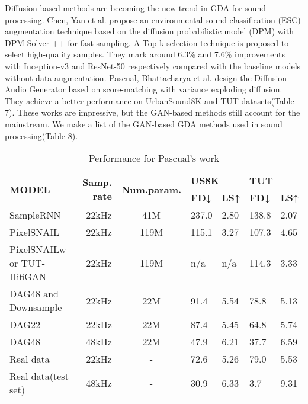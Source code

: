 \documentclass[preprint,12pt,authoryear]{elsarticle}
\begin{document}
Diffusion-based methods are becoming the new trend in GDA for sound processing. Chen, Yan et al. propose an environmental sound classification (ESC) augmentation technique based on the diffusion probabilistic model (DPM) with DPM-Solver ++ for fast sampling\cite{apl72}. A Top-k selection technique is proposed to select high-quality samples. They mark around 6.3\% and 7.6\% improvements with Inception-v3 and ResNet-50 respectively compared with the baseline models without data augmentation. Pascual, Bhattacharya et al. design the Diffusion Audio Generator based on score-matching with variance exploding diffusion\cite{apl73}. They achieve a better performance on UrbanSound8K and TUT datasets(Table 7). These works are impressive, but the GAN-based methods still account for the mainstream. We make a list of the GAN-based GDA methods used in sound processing(Table 8).
\begin{table}[t]
\begin{tabular}{p{2cm}rcllll}
\hline
\multirow{2}{*}{\textbf{MODEL}} &
  \multirow{2}{*}{\textbf{Samp. rate}} &
  \multirow{2}{*}{\textbf{Num.param.}} &
  \multicolumn{2}{l}{\textbf{US8K}} &
  \multicolumn{2}{l}{\textbf{TUT}} \\ \cline{4-7} 
                        &       &      & \textbf{FD↓} & \textbf{LS↑} & \textbf{FD↓} & \textbf{LS↑} \\ \hline
SampleRNN               & 22kHz & 41M  & 237.0        & 2.80         & 138.8        & 2.07         \\
PixelSNAIL              & 22kHz & 119M & 115.1        & 3.27         & 107.3        & 4.65         \\
PixelSNAILw or TUT-HifiGAN & 22kHz & 119M & n/a          & n/a          & 114.3        & 3.33         \\ \hline
DAG48 and Downsample        & 22kHz & 22M  & 91.4         & 5.54         & 78.8         & 5.13         \\
DAG22                   & 22kHz & 22M  & 87.4         & 5.45         & 64.8         & 5.74         \\
DAG48                   & 48kHz & 22M  & 47.9         & 6.21         & 37.7         & 6.59         \\ \hline
Real data               & 22kHz & -    & 72.6         & 5.26         & 79.0         & 5.53         \\
Real data(test set)     & 48kHz & -    & 30.9         & 6.33         & 3.7          & 9.31         \\ \hline
\end{tabular}
\caption{Performance for Pascual's work}
\label{tab:my-table}
\end{table}
\end{document}
